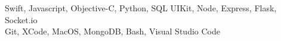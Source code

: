   Swift, Javascript, Objective-C, Python, SQL
   UIKit, Node, Express, Flask, Socket.io\\
  Git, XCode, MacOS, MongoDB, Bash, Visual Studio Code
